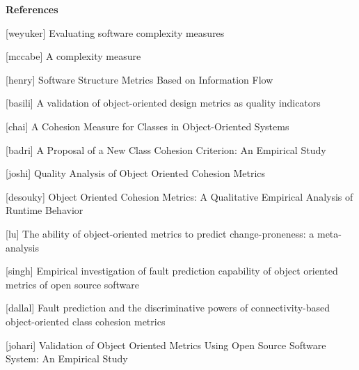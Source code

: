 \textbf{References}

[weyuker] Evaluating software complexity measures

[mccabe] A complexity measure

[henry] Software Structure Metrics Based on Information Flow

[basili] A validation of object-oriented design metrics as quality indicators

[chai] A Cohesion Measure for Classes in Object-Oriented Systems

[badri] A Proposal of a New Class Cohesion Criterion: An Empirical Study

[joshi] Quality Analysis of Object Oriented Cohesion Metrics

[desouky] Object Oriented Cohesion Metrics: A Qualitative Empirical Analysis of Runtime Behavior

[lu] The ability of object-oriented metrics to predict change-proneness: a meta-analysis

[singh] Empirical investigation of fault prediction capability of object oriented metrics of open source software

[dallal] Fault prediction and the discriminative powers of connectivity-based object-oriented class cohesion metrics

[johari] Validation of Object Oriented Metrics Using Open Source Software System: An Empirical Study